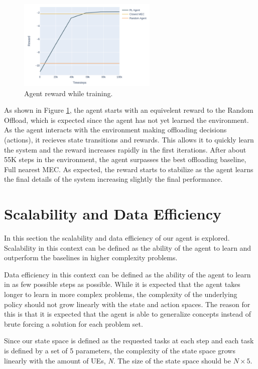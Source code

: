 \begin{figure}[H]
  \centering
  \includegraphics[width=250px]{images/5_5_training.png}
  \caption{Agent reward while training.}  \label{5_5_training}
\end{figure}

As shown in Figure \ref{5_5_training}, the agent starts with an equivelent reward to the Random Offload, which is expected since the agent has not yet learned the environment. As the agent interacts with the environment making offloading decisions (actions), it recieves state transitions and rewards. This allows it to quickly learn the system and the reward increases rapidly in the first iterations. After about 55K steps in the environment, the agent surpasses the best offloading baseline, Full nearest MEC. As expected, the reward starts to stabilize as the agent learns the final details of the system increasing slightly the final performance.

\section{Scalability and Data Efficiency} \label{scalability_data}

In this section the scalability and data efficiency of our agent is explored. Scalability in this context can be defined as the ability of the agent to learn and outperform the baselines in higher complexity problems. 

Data efficiency in this context can be defined as the ability of the agent to learn in as few possible steps as possible. While it is expected that the agent takes longer to learn in more complex problems, the complexity of the underlying policy should not grow linearly with the state and action spaces. The reason for this is that it is expected that the agent is able to generalize concepts instead of brute forcing a solution for each problem set.

Since our state space is defined as the requested tasks at each step and each task is defined by a set of 5 parameters, the complexity of the state space grows linearly with the amount of \acrshort{UE}s, \emph{N}. The size of the state space should be $N \times 5$. 

